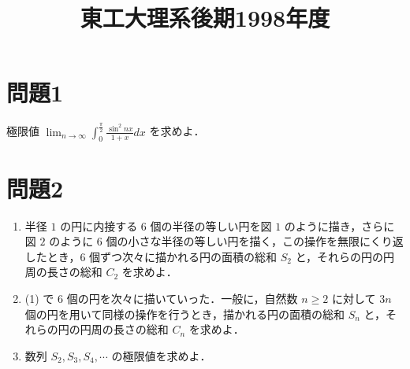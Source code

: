 \documentclass[unicode,12pt, a4paper]{ltjsarticle}%
\title{東工大理系後期1998年度}
\begin{document}
\maketitle
\section{問題1}
極限値 $\displaystyle \lim_{n \to \infty} \int_0^\frac{\pi}{2} \frac{\sin^2 nx}{1+x} dx$ を求めよ．



\section{問題2}
\begin{enumerate}
    \item 半径 $1$ の円に内接する $6$ 個の半径の等しい円を図 $1$ のように描き，さらに図 $2$ のように $6$ 個の小さな半径の等しい円を描く，この操作を無限にくり返したとき，$6$ 個ずつ次々に描かれる円の面積の総和 $S_2$ と，それらの円の円周の長さの総和 $C_2$ を求めよ．
    \item (1) で $6$ 個の円を次々に描いていった．一般に，自然数 $n \ge 2$ に対して $3n$ 個の円を用いて同様の操作を行うとき，描かれる円の面積の総和 $S_n$ と，それらの円の円周の長さの総和 $C_n$ を求めよ．
    \item 数列 $S_2, S_3, S_4, \cdots$ の極限値を求めよ．
\end{enumerate}
\end{document}
